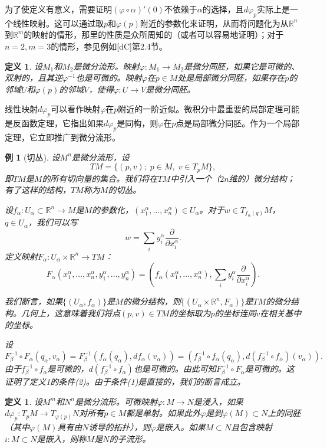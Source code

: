 \documentclass[12pt,a4paper]{ctexbook}
\newtheorem{definition}[theorem]{定义}
\newtheorem{example}[theorem]{例}
\begin{document}
为了使定义有意义，需要证明$(\varphi\circ\alpha)'(0)$不依赖于$\alpha$的选择，且$d\varphi_p$实际上是一个线性映射。这可以通过取$p$和$\varphi(p)$附近的参数化来证明，从而将问题化为从$\mathbb{R}^n$到$\mathbb{R}^m$的映射的情形，那里的性质是众所周知的（或者可以容易地证明）；对于$n=2,m=3$的情形，参见例如[dC]第2.4节。

\begin{definition}
设$M_1$和$M_2$是微分流形。映射$\varphi:M_1\to M_2$是微分同胚，如果它是可微的、双射的，且其逆$\varphi^{-1}$也是可微的。映射$\varphi$在$p\in M$处是局部微分同胚，如果存在$p$的邻域$U$和$\varphi(p)$的邻域$V$，使得$\varphi:U\to V$是微分同胚。
\end{definition}

线性映射$d\varphi_p$可以看作映射$\varphi$在$p$附近的一阶近似。微积分中最重要的局部定理可能是反函数定理，它指出如果$d\varphi_p$是同构，则$\varphi$在$p$点是局部微分同胚。作为一个局部定理，它立即推广到微分流形。

\begin{example}[切丛]
设$M^n$是微分流形，设
$$TM = \{(p,v);\; p\in M,\; v\in T_pM\},$$
即$TM$是$M$的所有切向量的集合。我们将在$TM$中引入一个（$2n$维的）微分结构；有了这样的结构，$TM$称为$M$的切丛。

设$f_\alpha:U_\alpha\subset\mathbb{R}^n\to M$是$M$的参数化，$(x_1^\alpha,\ldots,x_n^\alpha)\in U_\alpha$。对于$w\in T_{f_\alpha(q)}M$，$q\in U_\alpha$，我们可以写
$$w = \sum_i y_i^\alpha \frac{\partial}{\partial x_i^\alpha}.$$
定义映射$F_\alpha:U_\alpha\times\mathbb{R}^n\to TM$：
$$F_\alpha(x_1^\alpha,\ldots,x_n^\alpha,y_1^\alpha,\ldots,y_n^\alpha) = \left(f_\alpha(x_1^\alpha,\ldots,x_n^\alpha),\sum_i y_i^\alpha\frac{\partial}{\partial x_i^\alpha}\right).$$

我们断言，如果$\{(U_\alpha,f_\alpha)\}$是$M$的微分结构，则$\{(U_\alpha\times\mathbb{R}^n,F_\alpha)\}$是$TM$的微分结构。几何上，这意味着我们将点$(p,v)\in TM$的坐标取为$p$的坐标连同$v$在相关基中的坐标。

设
$$F_\beta^{-1}\circ F_\alpha(q_\alpha,v_\alpha) = F_\beta^{-1}(f_\alpha(q_\alpha),df_\alpha(v_\alpha)) = (f_\beta^{-1}\circ f_\alpha(q_\alpha), d(f_\beta^{-1}\circ f_\alpha)(v_\alpha)).$$
由于$f_\beta^{-1}\circ f_\alpha$是可微的，$d(f_\beta^{-1}\circ f_\alpha)$也是可微的。由此可知$F_\beta^{-1}\circ F_\alpha$是可微的。这证明了定义1的条件(2)。由于条件(1)是直接的，我们的断言成立。
\end{example}

\begin{definition}
设$M^m$和$N^n$是微分流形。可微映射$\varphi:M\to N$是浸入，如果$d\varphi_p:T_pM\to T_{\varphi(p)}N$对所有$p\in M$都是单射。如果此外$\varphi$是到$\varphi(M)\subset N$上的同胚（其中$\varphi(M)$具有由$N$诱导的拓扑），则$\varphi$是嵌入。如果$M\subset N$且包含映射$i:M\subset N$是嵌入，则称$M$是$N$的子流形。
\end{definition}
\end{document}
